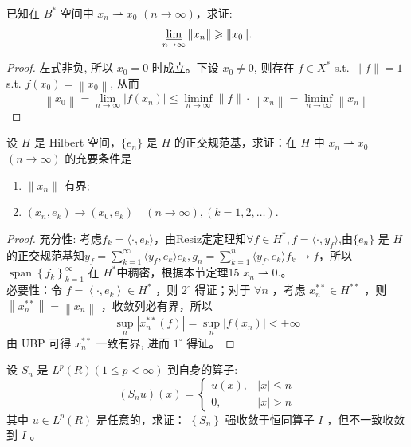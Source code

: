 \documentclass[lang=cn,newtx,10pt,scheme=chinese,thmcnt=chapter]{elegantbook}
\begin{document}
\begin{problem}
  已知在 ${B}^*$ 空间中 $x_n \rightharpoonup x_0$ $(n \to \infty)$，求证:
  \[
  \varliminf_{n \to \infty} \|x_n\| \geqslant \|x_0\|.
  \]
\end{problem}
\begin{proof}
左式非负, 所以 $x_0=0$ 时成立。下设 $x_0 \neq 0$, 则存在 $f \in X^*$ s.t. $\|f\|=1$ s.t. $f\left(x_0\right)=\left\|x_0\right\|$, 从而
\begin{equation*}
\left\|x_0\right\|=\lim _{n \rightarrow \infty}\left|f\left(x_n\right)\right| \leqslant \liminf _{n \rightarrow \infty}\|f\| \cdot\left\|x_n\right\|=\liminf _{n \rightarrow \infty}\left\|x_n\right\|
\end{equation*}

\end{proof}
\begin{problem}
  设 ${H}$ 是 Hilbert 空间，$\{e_n\}$ 是 ${H}$ 的正交规范基，求证：在 ${H}$ 中 $x_n \rightharpoonup x_0$ $(n \to \infty)$ 的充要条件是
  \begin{enumerate}
    \item $\|x_n\|$ 有界;
    \item $(x_n, e_k) \to (x_0, e_k) \quad (n \to \infty), (k = 1, 2, \dots)$.
  \end{enumerate}
\end{problem}
\begin{proof}
充分性: 考虑$f_k=\langle\cdot,e_k\rangle$，由Resiz定定理知$\forall f\in H^*,f=\langle\cdot,y_f\rangle$,由$\{e_n\}$ 是 ${H}$ 的正交规范基知$y_f=\sum\limits_{k=1}^\infty \langle y_f,e_k\rangle e_k,g_n=\sum\limits_{k=1}^n \langle y_f,e_k\rangle f_k\to f$，所以
 $\operatorname{span}\left\{f_k\right\}_{k=1}^\infty$ 在 $H^*$中稠密，根据本节定理15 $ x_n \rightharpoonup 0$.。\\
必要性：令 $f=\left\langle\cdot, e_k\right\rangle \in H^*$ ，则 $2^{\circ}$ 得证；对于 $\forall n$ ，考虑 $x_n^{* *} \in H^{* *}$ ，则 $\left\|x_n^{* *}\right\|=\left\|x_n\right\|$ ，收敛列必有界，所以
\begin{equation*}
\sup _n\left|x_n^{* *}(f)\right|=\sup _n\left|f\left(x_n\right)\right|<+\infty
\end{equation*}
由 UBP 可得 $x_n^{* *}$ 一致有界, 进而 $1^{\circ}$ 得证。
\end{proof}
\begin{problem}
设 $S_n$ 是 $L^p( R )(1 \leqslant p<\infty)$ 到自身的算子:
\begin{equation*}
\left(S_n u\right)(x)= \begin{cases}u(x), & |x| \leqslant n \\ 0, & |x|>n\end{cases}
\end{equation*}
其中 $u \in L^p( R )$ 是任意的，求证： $\left\{S_n\right\}$ 强收敛于恒同算子 $I$ ，但不一致收敛到 $I$ 。
\end{problem}
\end{document}
